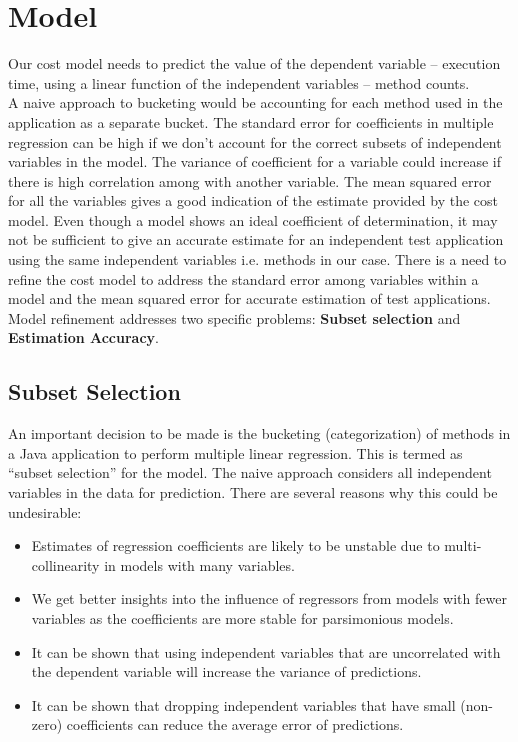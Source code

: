 \chapter{Model}
\label{model}
Our cost model needs to predict the value of the dependent variable -- execution time, using a linear function of the independent variables -- method counts. \\

A naive approach to bucketing would be accounting for each method used in the application as a separate bucket. The standard error for coefficients in multiple regression can be high if we don't account for the correct subsets of independent variables in the model. The variance of coefficient for a variable could increase if there is high correlation among with another variable. The mean squared error for all the variables gives a good indication of the estimate provided by the cost model. Even though a model shows an ideal coefficient of determination, it may not be sufficient to give an accurate estimate for an independent test application using the same independent variables i.e. methods in our case. There is a need to refine the cost model to address the standard error among variables within a model and the mean squared error for accurate estimation of test applications.\\

Model refinement addresses two specific problems: \textbf{Subset selection} and \textbf{Estimation Accuracy}.

\section{Subset Selection}
An important decision to be made is the bucketing (categorization) of methods in a Java application to perform multiple linear regression. This is termed as ``subset selection'' for the model. The naive approach considers all independent variables in the data for prediction. There are several reasons why this could be undesirable:
\begin{itemize}
\item Estimates of regression coefficients are likely to be unstable due to multi-collinearity in models with many variables. 
\item We get better insights into the influence of regressors from models with fewer variables as the coefficients are more stable for parsimonious models.
\item It can be shown that using independent variables that are uncorrelated with the dependent variable will increase the variance of predictions.
\item It can be shown that dropping independent variables that have small (non-zero) coefficients can reduce the average error of predictions.
\end{itemize}
